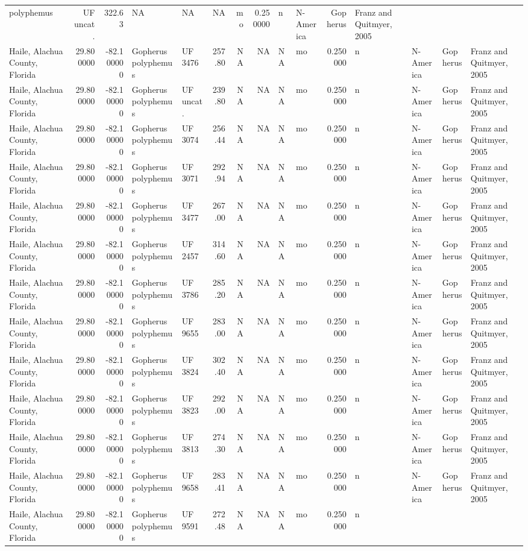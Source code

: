 \documentclass[]{article}
\begin{document}
\begin{longtable}[]{@{}lrrllrrrllrllll@{}}
polyphemus & UF uncat. & 322.63 & NA & NA & NA & mo & 0.250000 & n &
N-America & Gopherus & Franz and Quitmyer, 2005\tabularnewline
Haile, Alachua County, Florida & 29.800000 & -82.100000 & Gopherus
polyphemus & UF 3476 & 257.80 & NA & NA & NA & mo & 0.250000 & n &
N-America & Gopherus & Franz and Quitmyer, 2005\tabularnewline
Haile, Alachua County, Florida & 29.800000 & -82.100000 & Gopherus
polyphemus & UF uncat. & 239.80 & NA & NA & NA & mo & 0.250000 & n &
N-America & Gopherus & Franz and Quitmyer, 2005\tabularnewline
Haile, Alachua County, Florida & 29.800000 & -82.100000 & Gopherus
polyphemus & UF 3074 & 256.44 & NA & NA & NA & mo & 0.250000 & n &
N-America & Gopherus & Franz and Quitmyer, 2005\tabularnewline
Haile, Alachua County, Florida & 29.800000 & -82.100000 & Gopherus
polyphemus & UF 3071 & 292.94 & NA & NA & NA & mo & 0.250000 & n &
N-America & Gopherus & Franz and Quitmyer, 2005\tabularnewline
Haile, Alachua County, Florida & 29.800000 & -82.100000 & Gopherus
polyphemus & UF 3477 & 267.00 & NA & NA & NA & mo & 0.250000 & n &
N-America & Gopherus & Franz and Quitmyer, 2005\tabularnewline
Haile, Alachua County, Florida & 29.800000 & -82.100000 & Gopherus
polyphemus & UF 2457 & 314.60 & NA & NA & NA & mo & 0.250000 & n &
N-America & Gopherus & Franz and Quitmyer, 2005\tabularnewline
Haile, Alachua County, Florida & 29.800000 & -82.100000 & Gopherus
polyphemus & UF 3786 & 285.20 & NA & NA & NA & mo & 0.250000 & n &
N-America & Gopherus & Franz and Quitmyer, 2005\tabularnewline
Haile, Alachua County, Florida & 29.800000 & -82.100000 & Gopherus
polyphemus & UF 9655 & 283.00 & NA & NA & NA & mo & 0.250000 & n &
N-America & Gopherus & Franz and Quitmyer, 2005\tabularnewline
Haile, Alachua County, Florida & 29.800000 & -82.100000 & Gopherus
polyphemus & UF 3824 & 302.40 & NA & NA & NA & mo & 0.250000 & n &
N-America & Gopherus & Franz and Quitmyer, 2005\tabularnewline
Haile, Alachua County, Florida & 29.800000 & -82.100000 & Gopherus
polyphemus & UF 3823 & 292.00 & NA & NA & NA & mo & 0.250000 & n &
N-America & Gopherus & Franz and Quitmyer, 2005\tabularnewline
Haile, Alachua County, Florida & 29.800000 & -82.100000 & Gopherus
polyphemus & UF 3813 & 274.30 & NA & NA & NA & mo & 0.250000 & n &
N-America & Gopherus & Franz and Quitmyer, 2005\tabularnewline
Haile, Alachua County, Florida & 29.800000 & -82.100000 & Gopherus
polyphemus & UF 9658 & 283.41 & NA & NA & NA & mo & 0.250000 & n &
N-America & Gopherus & Franz and Quitmyer, 2005\tabularnewline
Haile, Alachua County, Florida & 29.800000 & -82.100000 & Gopherus
polyphemus & UF 9591 & 272.48 & NA & NA & NA & mo & 0.250000 & n &

\end{longtable}
\end{document}
